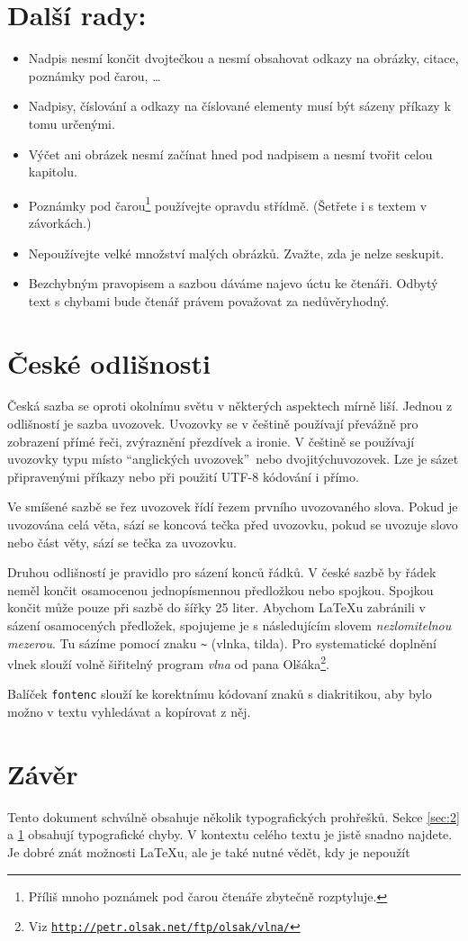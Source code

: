 \documentclass[a4paper, 10pt, twocolumn]{article}
\begin{document}
\section{Další rady:}
\label{sec:3}
\begin{itemize} 
\item Nadpis nesmí končit dvojtečkou a nesmí obsahovat odkazy na obrázky, citace, poznámky pod čarou, \dots
\item Nadpisy, číslování a odkazy na číslované elementy musí být sázeny příkazy k tomu určenými.
\item Výčet ani obrázek nesmí začínat hned pod nadpisem a nesmí tvořit celou kapitolu.
\item Poznámky pod čarou\footnote{Příliš mnoho poznámek pod čarou čtenáře zbytečně rozptyluje.} používejte opravdu střídmě. (Šetřete i s textem v závorkách.)
\item Nepoužívejte velké množství malých obrázků. Zvažte, zda je nelze seskupit.
\item Bezchybným pravopisem a sazbou dáváme najevo úctu ke čtenáři. Odbytý text s chybami bude čtenář právem považovat za nedůvěryhodný.
\end{itemize}

\section{České odlišnosti}

Česká sazba se oproti okolnímu světu v některých aspektech mírně liší. Jednou z odlišností je sazba uvozovek. Uvozovky se v češtině používají převážně pro zobrazení přímé řeči, zvýraznění přezdívek a ironie. V češtině se používají uvozovky typu  místo \textquotedblleft anglických uvozovek\textquotedblright \ nebo \textquotedbl dvojitých\textquotedbl uvozovek. Lze je sázet připravenými příkazy nebo při použití UTF-8 kódování i přímo.

Ve smíšené sazbě se řez uvozovek řídí řezem prvního uvozovaného slova. Pokud je uvozována celá věta, sází se koncová tečka před uvozovku, pokud se uvozuje slovo nebo část věty, sází se tečka za uvozovku.

Druhou odlišností je pravidlo pro sázení konců řádků. V české sazbě by řádek neměl končit osamocenou jednopísmennou předložkou nebo spojkou. Spojkou  končit může pouze při sazbě do šířky 25 liter. Abychom \LaTeX u zabránili v sázení osamocených předložek, spojujeme je s následujícím slovem \emph{nezlomitelnou mezerou}. Tu sázíme pomocí znaku \verb|~| (vlnka, tilda). Pro systematické doplnění vlnek slouží volně šiřitelný program \emph{vlna} od pana Olšáka\footnote{Viz \texttt{\url{http://petr.olsak.net/ftp/olsak/vlna/}}}.

Balíček \verb|fontenc| slouží ke korektnímu kódovaní znaků s diakritikou, aby bylo možno v textu vyhledávat a kopírovat z něj.

\section{Závěr}
Tento dokument schválně obsahuje několik typografických prohřešků. Sekce \ref{sec:2} a \ref{sec:3} obsahují typografické chyby. V kontextu celého textu je jistě snadno najdete. Je dobré znát možnosti \LaTeX u, ale je také nutné vědět, kdy je nepoužít
\end{document}
